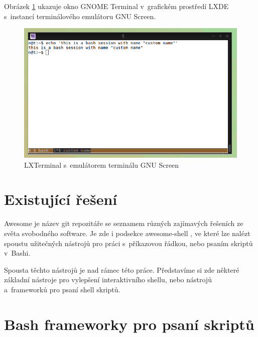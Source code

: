 \documentclass[thesis=M,czech]{FITthesis}[2012/06/26]
\begin{document}
Obrázek \ref{fig:terminal_invert} ukazuje okno GNOME Terminal v~grafickém prostředí LXDE s~instancí terminálového emulátoru GNU Screen.

\begin{figure}[htb]\centering
	\includegraphics[width=\textwidth]{./images/terminal_invert}
	\caption{LXTerminal s~emulátorem terminálu GNU Screen}
	\label{fig:terminal_invert}
\end{figure}






\section{Existující řešení}

Awesome \cite{awesome} je název git repozitáře se seznamem různých zajímavých řešeních ze světa svobodného software. Je zde i podsekce awesome-shell \cite{awesomeshell}, ve které lze nalézt spoustu užitečných nástrojů pro práci s~příkazovou řádkou, nebo psaním skriptů v~Bashi.

Spousta těchto nástrojů je nad rámec této práce. Představíme si zde některé základní nástroje pro vylepšení interaktivního shellu, nebo nástrojů a~frameworků pro psaní shell skriptů.


\section{Bash frameworky pro psaní skriptů}
\end{document}
